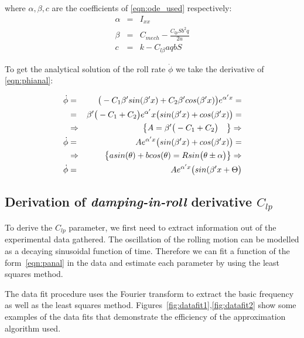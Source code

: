 where $\alpha, \beta, c$ are the coefficients of \ref{eqn:ode_used} respectively:
\begin{eqnarray}
    \alpha &=& I_{xx} \label{eqn:alpha}\\
    \beta &=&  C_{mech} - \frac{C_{lp}Sb^2q}{2u} \label{eqn:beta}\\
    c &=&  k - C_{l\beta}aqbS \label{eqn:c}
\end{eqnarray}

%
%
%
%

\noindent To get the analytical solution of the roll rate $\dot{\phi}$ we take the derivative 
of \ref{eqn:phianal}:

\begin{eqnarray}
    \dot{\phi} &=&   \big(-C_1 \beta' sin(\beta' x) + C_2 \beta' cos(\beta' x) \big) e^{\alpha' x} =\notag\\
     &=&  \beta'\big(-C_1+C_2\big)e^{\alpha'}x\big(sin(\beta'x) + cos(\beta'x)\big) = \notag\\
     &\Rightarrow& \big\{A = \beta' \big(-C_1+C_2\big) \quad \big\} \Rightarrow \notag\\
     \dot{\phi} &=& Ae^{\alpha'x}\big(sin(\beta'x) + cos(\beta'x)\big) \label{eqn:panal} = \notag\\
     &\Rightarrow&  \big\{asin(\theta) + bcos(\theta) = Rsin\big(\theta \pm \alpha\big)\big\}\Rightarrow \notag\\
     \dot{\phi} &=& Ae^{\alpha'x}\big(sin(\beta'x + \Theta \big) \label{eqn:panal} \label{eqn:panal}
\end{eqnarray}

\subsection{Derivation of \textit{damping-in-roll} derivative $C_{lp}$}

To derive the $C_{lp}$ parameter, we first need to extract information out of 
the experimental data gathered. The oscillation of the rolling motion can be modelled as a 
decaying sinusoidal function of time. Therefore we can fit a function 
of the form~\ref{eqn:panal} in the data and estimate each parameter 
by using the least squares method.

The data fit procedure uses the Fourier transform to extract the basic frequency as well as the least squares method.
Figures~\ref{fig:datafit1},\ref{fig:datafit2} show some examples of the data fits that demonstrate the efficiency of the 
approximation algorithm used.

